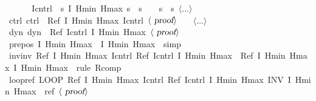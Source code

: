 \documentclass[envcountsame,envcountsect]{llncs}
\begin{document}
\begin{example}
\begin{isabellebody}
\isamarkupfalse%
{\isacharminus}\isanewline
\ \ \isanewline
\ \ \isamarkupfalse%
\ {\isacharquery}Icntrl\ {\isacharequal}\ {\isachardoublequoteopen}{\isasymlambda}s{\isachardot}\ I\ Hmin\ Hmax\ s\ {\isasymand}\ s{\isachardollar}{}\ {\isacharequal}\ {}\ {\isasymand}\ s{\isachardollar}{}\ {\isacharequal}\ s{\isachardollar}{}{\isachardoublequoteclose}\ $\langle \dots\rangle$\isanewline
\ \ \isamarkupfalse%
\ ctrl{\isacharcolon}\ {\isachardoublequoteopen}{\isacharquery}ctrl\ {\isasymle}\ Ref\ {\isasymlceil}I\ Hmin\ Hmax{\isasymrceil}\ {\isasymlceil}{\isacharquery}Icntrl{\isasymrceil}{\isachardoublequoteclose}\ $\langle \isa{proof}\rangle$\isanewline
\ \ \ $\langle \dots\rangle$\isanewline
\ \ \isamarkupfalse%
\ dyn{\isacharcolon}\ {\isachardoublequoteopen}{\isacharquery}dyn\ {\isasymle}\ Ref\ {\isasymlceil}{\isacharquery}Icntrl{\isasymrceil}\ {\isasymlceil}I\ Hmin\ Hmax{\isasymrceil}{\isachardoublequoteclose}\ $\langle \isa{proof}\rangle$\isanewline
\ \ \isanewline
\ \ \isamarkupfalse%
\ pre{\isacharunderscore}pos{\isacharcolon}\ {\isachardoublequoteopen}{\isasymlceil}I\ Hmin\ Hmax{\isasymrceil}\ {\isasymle}\ {\isasymlceil}I\ Hmin\ Hmax{\isasymrceil}{\isachardoublequoteclose}\ \isamarkupfalse\ simp\isanewline
\ \ \isamarkupfalse%
\ inv{\isacharunderscore}inv{\isacharcolon}\ {\isachardoublequoteopen}Ref\ {\isasymlceil}I\ Hmin\ Hmax{\isasymrceil}\ {\isasymlceil}{\isacharquery}Icntrl{\isasymrceil}{\isacharsemicolon}\ {\isacharparenleft}Ref\ {\isasymlceil}{\isacharquery}Icntrl{\isasymrceil}\ {\isasymlceil}I\ Hmin\ Hmax{\isasymrceil}{\isacharparenright}\ {\isasymle}\ Ref\ {\isasymlceil}I\ Hmin\ Hmax{\isasymrceil}\ {\isasymlceil}I\ Hmin\ Hmax{\isasymrceil}{\isachardoublequoteclose}\ \isamarkupfalse\ {\isacharparenleft}rule\ R{\isacharunderscore}comp{\isacharparenright}\isanewline
\ \ \isamarkupfalse%
\ loopref{\isacharcolon}\ {\isachardoublequoteopen}LOOP\ Ref\ {\isasymlceil}I\ Hmin\ Hmax{\isasymrceil}\ {\isasymlceil}{\isacharquery}Icntrl{\isasymrceil}{\isacharsemicolon}\ {\isacharparenleft}Ref\ {\isasymlceil}{\isacharquery}Icntrl{\isasymrceil}\ {\isasymlceil}I\ Hmin\ Hmax{\isasymrceil}{\isacharparenright}\ INV\ I\ Hmin\ Hmax\ {\isasymle}\ {\isacharquery}ref{\isachardoublequoteclose}\ $\langle \isa{proof}\rangle$\isanewline
\ \ \isamarkupfalse%

\end{isabellebody}
\end{example}
\end{document}
